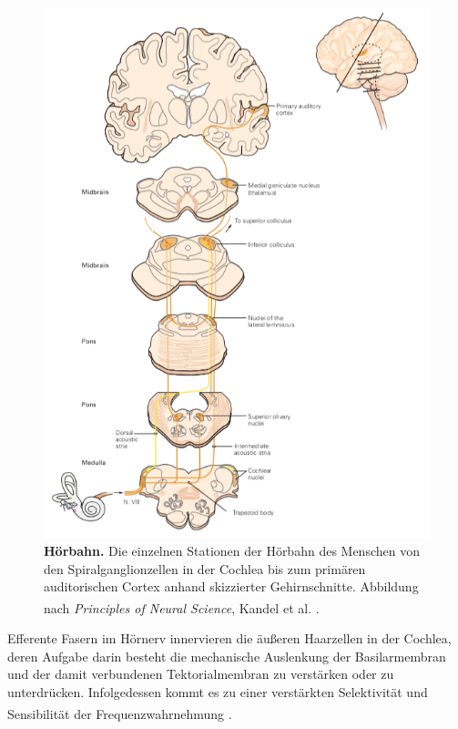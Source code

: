 \begin{figure}[H]
    \centering
    \includegraphics{pictures/auditory/hoerbahn_pathway.png}
    \caption[Hörbahn]{\textbf{Hörbahn.} Die einzelnen Stationen der Hörbahn des Menschen von den Spiralganglionzellen in der Cochlea bis zum primären auditorischen Cortex anhand skizzierter Gehirnschnitte. Abbildung nach \textit{Principles of Neural Science}, Kandel et al. \textsuperscript{\cite[Kap.~30]{kandel2013principles}}.}
    \label{fig:hoerbahn_pathway}
\end{figure}

\newpage
\noindent Efferente Fasern im Hörnerv innervieren die äußeren Haarzellen  in der Cochlea, deren Aufgabe darin besteht die mechanische Auslenkung der Basilarmembran und der damit verbundenen Tektorialmembran  zu verstärken oder zu unterdrücken. Infolgedessen kommt es zu einer verstärkten Selektivität und Sensibilität der Frequenzwahrnehmung \textsuperscript{\cite[Kap.~22]{paxinos2014rat}}.

